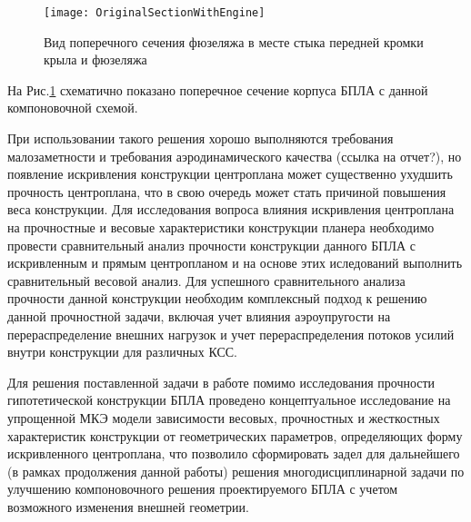 \begin{figure}[ht]
\captionsetup{justification=centering}
\centering
\texttt{[image: OriginalSectionWithEngine]}
%
\caption{Вид поперечного сечения фюзеляжа в месте стыка передней кромки крыла и фюзеляжа}
\label{fig:OriginalSectionWithEngine}
\end{figure}



На Рис.\ref{fig:OriginalSectionWithEngine} схематично показано поперечное сечение корпуса БПЛА с данной компоновочной схемой.

При использовании такого решения хорошо выполняются требования малозаметности и требования аэродинамического качества (ссылка на отчет?), но появление искривления конструкции центроплана может существенно ухудшить прочность центроплана, что в свою очередь может стать причиной повышения веса конструкции. Для исследования вопроса влияния искривления центроплана на прочностные и весовые характеристики конструкции планера необходимо провести сравнительный анализ прочности конструкции данного БПЛА с искривленным и прямым центропланом и на основе этих иследований выполнить сравнительный весовой анализ. Для успешного сравнительного анализа прочности данной конструкции необходим комплексный подход к решению данной прочностной задачи, включая учет влияния аэроупругости на перераспределение внешних нагрузок и учет перераспределения потоков усилий внутри конструкции для различных КСС.










Для решения поставленной задачи в работе помимо исследования прочности гипотетической конструкции БПЛА проведено концептуальное исследование на упрощенной МКЭ модели зависимости весовых, прочностных и жесткостных характеристик конструкции от геометрических параметров, определяющих форму искривленного центроплана, что позволило сформировать задел для дальнейшего (в рамках продолжения данной работы) решения многодисциплинарной задачи по улучшению компоновочного решения проектируемого БПЛА с учетом возможного изменения внешней геометрии. 


